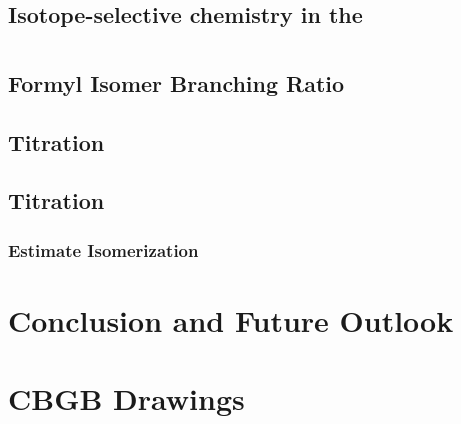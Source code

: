 \documentclass [PhD,nolistoftables,scheader] {uclathes}
\begin{document}
\chapter{}
	\section{Isotope-selective chemistry in the  }
	

\chapter{}
	

\chapter{}
	\section{Formyl Isomer Branching Ratio}
	

	\section{ Titration}
	

	\section{ Titration}
	
	
		\subsection{Estimate Isomerization}
		

\chapter{Conclusion and Future Outlook}
	

\appendix
	
	\chapter{CBGB Drawings}
	




\end{document}
